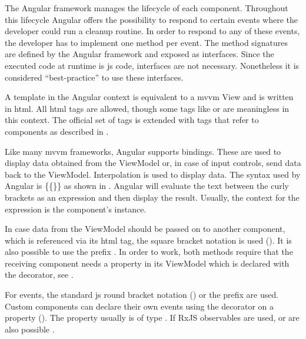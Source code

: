 The Angular framework manages the lifecycle of each component. Throughout this lifecycle Angular offers the possibility to respond to certain events \zB {} where the developer could run a cleanup routine. In order to respond to any of these events, the developer has to implement one method per event. The method signatures are defined by the Angular framework and exposed as interfaces. Since the executed code at runtime is \gls{js} code, interfaces are not necessary. Nonetheless it is considered \enquote{best-practice} to use these interfaces.

A template in the Angular context is equivalent to a \gls{mvvm} View and is written in \gls{html}. All \gls{html} tags are allowed, though some tags like  or  are meaningless in this context. The official set of tags is extended with tags that refer to components as described in .

Like many \gls{mvvm} frameworks, Angular supports bindings. These are used to display data obtained from the ViewModel or, in case of input controls, send data back to the ViewModel. Interpolation is used to display data. The syntax used by Angular is \{\{\}\} as shown in . Angular will evaluate the text between the curly brackets as an expression and then display the result. Usually, the context for the expression is the component's instance.


In case data from the ViewModel should be passed on to another component, which is referenced via its \gls{html} tag, the square bracket notation is used (). It is also possible to use the  prefix \zB {}. In order to work, both methods require that the receiving component needs a property in its ViewModel which is declared with the  decorator, see .

For events, the standard \gls{js} round bracket notation () or the  prefix \zB {} are used. Custom components can declare their own events using the  decorator on a property (). The property usually is of type . If RxJS observables are used,  or  are also possible \cite{rxjs}.


